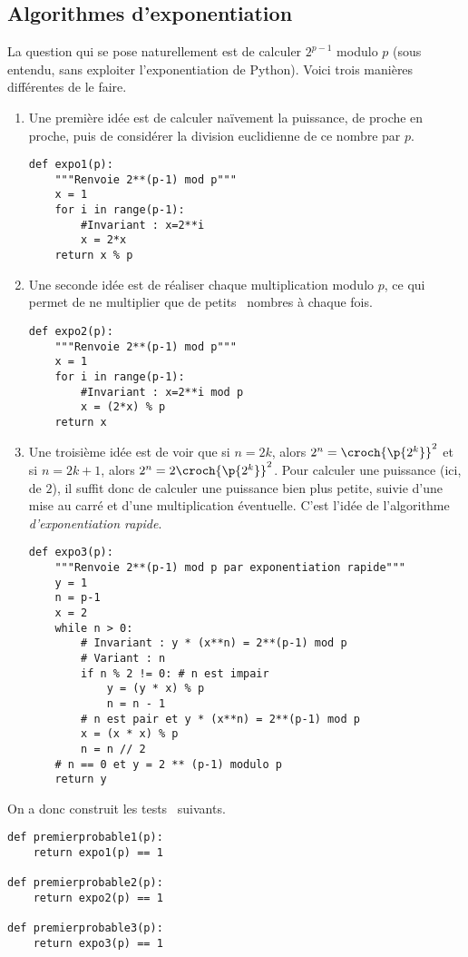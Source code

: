 \subsection{Algorithmes d'exponentiation}

La question qui se pose naturellement est de calculer $2^{p-1}$ modulo $p$ (sous entendu, sans exploiter l'exponentiation de Python). Voici trois manières différentes de le faire. 

\begin{enumerate}
  \item Une première idée est de calculer naïvement la puissance, de proche en proche, puis de considérer la division euclidienne de ce nombre par $p$.
\begin{lstlisting}
def expo1(p):
    """Renvoie 2**(p-1) mod p"""
    x = 1
    for i in range(p-1):
    	#Invariant : x=2**i
        x = 2*x
    return x % p
\end{lstlisting}
  \item Une seconde idée est de réaliser chaque multiplication modulo $p$, ce qui permet de ne multiplier que de \og petits \fg\ nombres à chaque fois. 
\begin{lstlisting}
def expo2(p):
    """Renvoie 2**(p-1) mod p"""
    x = 1
    for i in range(p-1):
    	#Invariant : x=2**i mod p
        x = (2*x) % p
    return x  
\end{lstlisting}
  \item Une troisième idée est de voir que si $n = 2k$, alors $2^n = \croch{\p{2^k}}^2$ et si $n = 2k+1$, alors $2^n = 2\croch{\p{2^k}}^2$. 
  Pour calculer une puissance (ici, de $2$), il suffit donc de calculer une puissance bien plus petite, suivie d'une mise au carré et d'une multiplication éventuelle. C'est l'idée de l'algorithme \emph{d'exponentiation rapide}.
\begin{lstlisting}
def expo3(p):
    """Renvoie 2**(p-1) mod p par exponentiation rapide"""
    y = 1
    n = p-1
    x = 2
    while n > 0:
        # Invariant : y * (x**n) = 2**(p-1) mod p
        # Variant : n
        if n % 2 != 0: # n est impair
            y = (y * x) % p
            n = n - 1
        # n est pair et y * (x**n) = 2**(p-1) mod p
        x = (x * x) % p
        n = n // 2
    # n == 0 et y = 2 ** (p-1) modulo p
    return y
\end{lstlisting}
\end{enumerate}

On a donc construit les \og tests \fg\ suivants.

\begin{lstlisting}
def premierprobable1(p):
    return expo1(p) == 1

def premierprobable2(p):
    return expo2(p) == 1

def premierprobable3(p):
    return expo3(p) == 1
\end{lstlisting}

